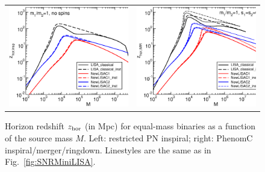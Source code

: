 \documentclass{iopart}
\begin{document}
%
\begin{figure}[H]
\begin{center}
\begin{tabular}{cc}
\includegraphics[scale=0.33,clip=true]{FigEmanuele/zhorNewLISAinsp.eps}
&\includegraphics[scale=0.33,clip=true]{FigEmanuele/zhorNewLISAIMR.eps}\\
\end{tabular}
\caption{\label{fig:zMiniLISA} Horizon redshift $z_{\rm hor}$ (in Mpc) for
  equal-mass binaries as a function of the source mass $M$. Left: restricted
  PN inspiral; right: {\sc PhenomC} inspiral/merger/ringdown. Linestyles are
  the same as in Fig.~\ref{fig:SNRMiniLISA}.}
\end{center}
\end{figure}
%
\end{document}
